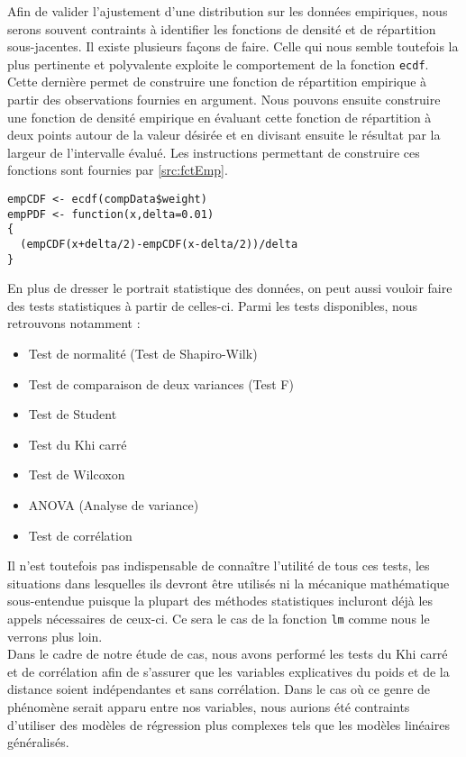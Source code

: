 Afin de valider l'ajustement d'une distribution sur les données empiriques, nous serons souvent contraints à identifier les fonctions de densité et de répartition sous-jacentes. Il existe plusieurs façons de faire. Celle qui nous semble toutefois la plus pertinente et polyvalente exploite le comportement de la fonction \texttt{ecdf}. Cette dernière permet de construire une fonction de répartition empirique à partir des observations fournies en argument. Nous pouvons ensuite construire une fonction de densité empirique en évaluant cette fonction de répartition à deux points autour de la valeur désirée et en divisant ensuite le résultat par la largeur de l'intervalle évalué. Les instructions permettant de construire ces fonctions sont fournies par \autoref{src:fctEmp}. \\

\begin{lstlisting}[caption = Fonctions de densité et de répartition empiriques,label=src:fctEmp]
empCDF <- ecdf(compData$weight)
empPDF <- function(x,delta=0.01)
{
  (empCDF(x+delta/2)-empCDF(x-delta/2))/delta
}
\end{lstlisting}

\vspace{\baselineskip}
En plus de dresser le portrait statistique des données, on peut aussi vouloir faire des tests statistiques à partir de celles-ci. Parmi les tests disponibles, nous retrouvons notamment :
\begin{itemize}
	\item Test de normalité (Test de Shapiro-Wilk)
	\item Test de comparaison de deux variances (Test F)
	\item Test de Student
	\item Test du Khi carré
	\item Test de Wilcoxon
	\item ANOVA (Analyse de variance)
	\item Test de corrélation
\end{itemize}
Il n'est toutefois pas indispensable de connaître l'utilité de tous ces tests, les situations dans lesquelles ils devront être utilisés ni la mécanique mathématique sous-entendue puisque la plupart des méthodes statistiques incluront déjà les appels nécessaires de ceux-ci. Ce sera le cas de la fonction \texttt{lm} comme nous le verrons plus loin. \cite{testStatsR} \\

Dans le cadre de notre étude de cas, nous avons performé les tests du Khi carré et de corrélation afin de s'assurer que les variables explicatives du poids et de la distance soient indépendantes et sans corrélation. Dans le cas où ce genre de phénomène serait apparu entre nos variables, nous aurions été contraints d'utiliser des modèles de régression plus complexes tels que les modèles linéaires généralisés. \\


